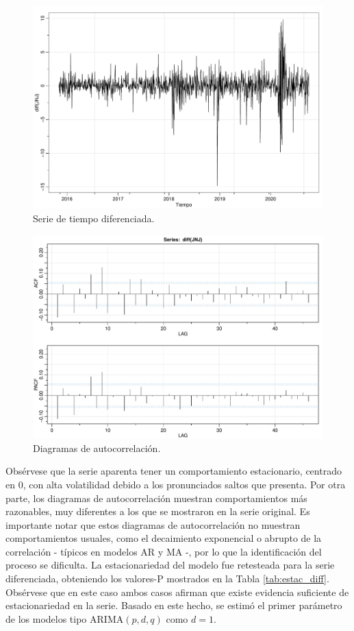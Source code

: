 \documentclass[conference]{IEEEtran}
\begin{document}
\begin{figure}
    \centering
    \includegraphics[width=\columnwidth]{figs/ts_diff.pdf}
    \caption{Serie de tiempo diferenciada.}
    \label{fig:ts_diff}
\end{figure}

\begin{figure}
    \centering
    \includegraphics[width=\columnwidth]{figs/acf_diff.pdf}
    \caption{Diagramas de autocorrelación.}
    \label{fig:acf_diff}
\end{figure}

Obsérvese que la serie aparenta tener un comportamiento estacionario, centrado en 0, con alta volatilidad debido a los pronunciados saltos que presenta. Por otra parte, los diagramas de autocorrelación muestran comportamientos más razonables, muy diferentes a los que se mostraron en la serie original. Es importante notar que estos diagramas de autocorrelación no muestran comportamientos usuales, como el decaimiento exponencial o abrupto de la correlación - típicos en modelos AR y MA -, por lo que la identificación del proceso se dificulta. La estacionariedad del modelo fue retesteada para la serie diferenciada, obteniendo los valores-P mostrados en la Tabla \ref{tab:estac_diff}. Obsérvese que en este caso ambos casos afirman que existe evidencia suficiente de estacionariedad en la serie. Basado en este hecho, se estimó el primer parámetro de los modelos tipo $\mathrm{ARIMA}(p,d,q)$ como $d=1$.
\end{document}
